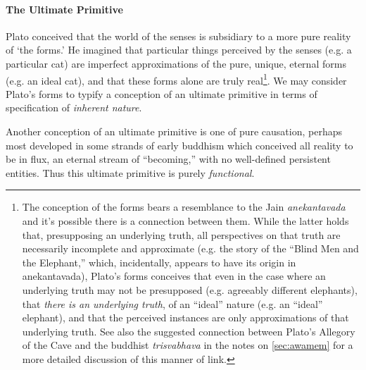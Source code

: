 \documentclass[pra,twocolumn,groupedaddress,10pt]{revtex4}
\theoremstyle{definition}
\begin{document}
\paragraph{The Ultimate Primitive} \label{sec:ultpri} Plato conceived that the world of the senses is subsidiary to a more pure reality of `the forms.' He imagined that particular things perceived by the senses (e.g. a particular cat) are imperfect approximations of the pure, unique, eternal forms (e.g. an ideal cat), and that these forms alone are truly real\footnote{The conception of the forms bears a resemblance to the Jain \emph{anekantavada} and it's possible there is a connection between them. While the latter holds that, presupposing an underlying truth, all perspectives on that truth are necessarily incomplete and approximate (e.g. the story of the ``Blind Men and the Elephant,'' which, incidentally, appears to have its origin in anekantavada), Plato's forms conceives that even in the case where an underlying truth may not be presupposed (e.g. agreeably different elephants), that \emph{there is an underlying truth}, of an ``ideal'' nature (e.g. an ``ideal'' elephant), and that the perceived instances are only approximations of that underlying truth. See also the suggested connection between Plato's Allegory of the Cave and the buddhist \emph{trisvabhava} in the notes on \autoref{sec:awamem} for a more detailed discussion of this manner of link.}. We may consider Plato's forms to typify a conception of an ultimate primitive in terms of specification of \emph{inherent nature}.

Another conception of an ultimate primitive is one of pure causation, perhaps most developed in some strands of early buddhism which conceived all reality to be in flux, an eternal stream of ``becoming,'' with no well-defined persistent entities. Thus this ultimate primitive is purely \emph{functional}.
\end{document}
